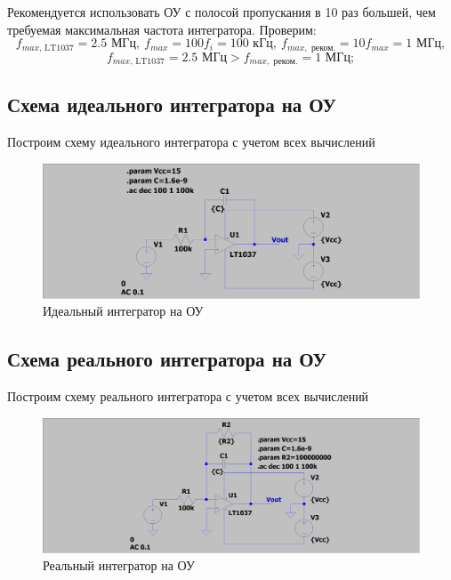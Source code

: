 \documentclass[a4paper, 12pt]{article}
\begin{document}
    
    Рекомендуется использовать ОУ с полосой пропускания в 10 раз большей, чем требуемая максимальная
    частота интегратора. Проверим:
    $$
    f_{max,\,\text{LT1037}}=2.5\text{ МГц},\ f_{max}=100f_i=100\text{ кГц},\ f_{max,\text{ реком.}}=10f_{max}=1\text{ МГц},
    $$
    $$
    f_{max,\,\text{LT1037}}=2.5\text{ МГц}>f_{max,\text{ реком.}}=1\text{ МГц};
    $$


    \subsection{Схема идеального интегратора на ОУ}
    Построим схему идеального интегратора с учетом всех вычислений
    \begin{figure}[H]
        \centering
        \includegraphics[scale=0.22]{scheme6.png}
        \captionsetup{skip=0pt}
        \caption{Идеальный интегратор на ОУ}
        \label{fig:scheme6}
    \end{figure}


    \subsection{Схема реального интегратора на ОУ}
    Построим схему реального интегратора с учетом всех вычислений
    \begin{figure}[H]
        \centering
        \includegraphics[scale=0.22]{scheme7.png}
        \captionsetup{skip=0pt}
        \caption{Реальный интегратор на ОУ}
        \label{fig:scheme7}
    \end{figure}
\end{document}
